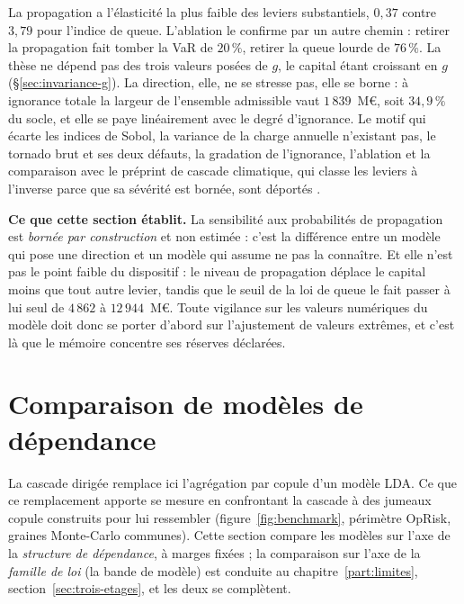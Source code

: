 \vspace{4pt}
\noindent La propagation a l'élasticité la plus faible des leviers substantiels, $0{,}37$ contre
$3{,}79$ pour l'indice de queue. L'ablation le confirme par un autre chemin : retirer la
propagation fait tomber la VaR de $20\,\%$, retirer la queue lourde de $76\,\%$. La thèse ne
dépend pas des trois valeurs posées de $g$, le capital étant croissant en $g$
(\S\ref{sec:invariance-g}). La direction, elle, ne se stresse pas, elle se borne : à ignorance
totale la largeur de l'ensemble admissible vaut $1\,839$~M\euro, soit $34{,}9\,\%$ du socle, et
elle se paye linéairement avec le degré d'ignorance. Le motif qui écarte les indices de Sobol, la
variance de la charge annuelle n'existant pas, le tornado brut et ses deux défauts, la gradation
de l'ignorance, l'ablation et la comparaison avec le préprint de cascade climatique, qui classe
les leviers à l'inverse parce que sa sévérité est bornée, sont déportés
\matcomp.

\begin{cle}
\textbf{Ce que cette section établit.} La sensibilité aux probabilités de propagation est
\emph{bornée par construction} et non estimée : c'est la différence entre un modèle qui pose une
direction et un modèle qui assume ne pas la connaître. Et elle n'est pas le point faible du
dispositif : le niveau de propagation déplace le capital moins que tout autre levier, tandis que
le seuil de la loi de queue le fait passer à lui seul de $4\,862$ à $12\,944$~M\euro. Toute vigilance sur les
valeurs numériques du modèle doit donc se porter d'abord sur l'ajustement de valeurs extrêmes,
et c'est là que le mémoire concentre ses réserves déclarées.
\end{cle}

\section{Comparaison de modèles de dépendance}

La cascade dirigée remplace ici l'agrégation par copule d'un modèle LDA. Ce que ce
remplacement apporte se mesure en confrontant la cascade à des jumeaux copule construits pour lui
ressembler (figure~\ref{fig:benchmark}, périmètre OpRisk, graines
Monte-Carlo communes). Cette section compare les modèles sur l'axe de la \emph{structure de
dépendance}, à marges fixées ; la comparaison sur l'axe de la \emph{famille de loi} (la bande
de modèle) est conduite au chapitre~\ref{part:limites}, section~\ref{sec:trois-etages}, et les
deux se complètent.

